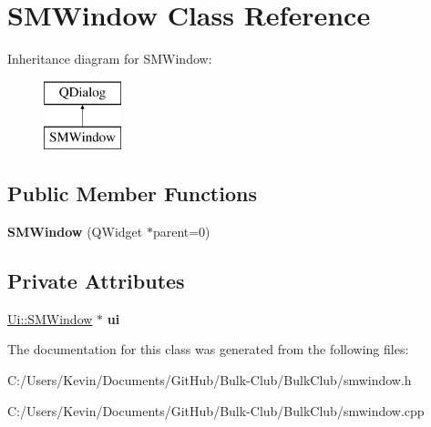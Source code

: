 \hypertarget{class_s_m_window}{}\section{S\+M\+Window Class Reference}
\label{class_s_m_window}
Inheritance diagram for S\+M\+Window\+:\begin{figure}[H]
\begin{center}
\leavevmode
\includegraphics[height=2.000000cm]{class_s_m_window}
\end{center}
\end{figure}
\subsection*{Public Member Functions}
\begin{DoxyCompactItemize}
\item 
\mbox{\label{class_s_m_window_a6dac5dbb3fec3de0edb11bac3b821565}} 
{\bfseries S\+M\+Window} (Q\+Widget $\ast$parent=0)
\end{DoxyCompactItemize}
\subsection*{Private Attributes}
\begin{DoxyCompactItemize}
\item 
\mbox{\label{class_s_m_window_a4781161ac110f6d47ee9143f46a1fa35}} 
\mbox{\hyperlink{class_ui_1_1_s_m_window}{Ui\+::\+S\+M\+Window}} $\ast$ {\bfseries ui}
\end{DoxyCompactItemize}


The documentation for this class was generated from the following files\+:\begin{DoxyCompactItemize}
\item 
C\+:/\+Users/\+Kevin/\+Documents/\+Git\+Hub/\+Bulk-\/\+Club/\+Bulk\+Club/smwindow.\+h\item 
C\+:/\+Users/\+Kevin/\+Documents/\+Git\+Hub/\+Bulk-\/\+Club/\+Bulk\+Club/smwindow.\+cpp\end{DoxyCompactItemize}

